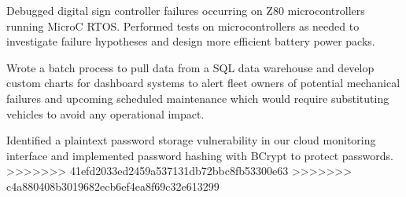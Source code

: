 \begin{cventries}
{\begin{cvitems}
		\item {Debugged digital sign controller failures occurring on Z80 microcontrollers running MicroC RTOS. Performed tests on microcontrollers as needed to investigate failure hypotheses and design more efficient battery power packs.}
		\item {Wrote a batch process to pull data from a SQL data warehouse and develop custom charts for dashboard systems to alert fleet owners of potential mechanical failures and upcoming scheduled maintenance which would require substituting vehicles to avoid any operational impact.}
		\item {Identified a plaintext password storage vulnerability in our cloud monitoring interface and implemented password hashing with BCrypt to protect passwords.}
>>>>>>> 41efd2033ed2459a537131db72bbc8fb53300e63
>>>>>>> c4a880408b3019682ecb6ef4ea8f69c32e613299
      \end{cvitems}
    }


\end{cventries}

